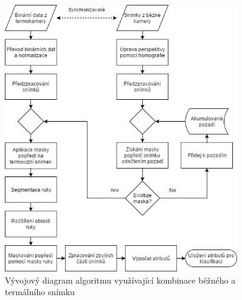     \begin{figure}[h]
      \centering
      \includegraphics[width=0.9\textwidth]{images/visible_thermal_detection_diagram.png}
      \caption{Vývojový diagram algoritmu využívající kombinace běžného a termálního snímku}
      \label{fig:visible_thermal_detection_diagram}
    \end{figure} 


    




